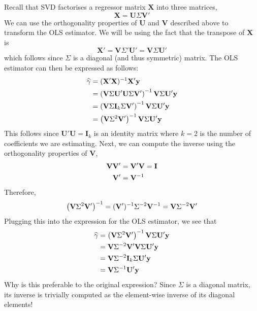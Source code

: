 \documentclass[10pt]{scrartcl}
\begin{document}
Recall that SVD factorises a regressor matrix \(\mathbf{X}\) into three
matrices, \[
\mathbf{X} = \mathbf{U} \Sigma \mathbf{V}'
\] We can use the orthogonality properties of \(\mathbf{U}\) and
\(\mathbf{V}\) described above to transform the OLS estimator. We will
be using the fact that the transpose of \(\mathbf{X}\) is \[
\mathbf{X}' = \mathbf{V} \Sigma' \mathbf{U}' = 
    \mathbf{V} \Sigma \mathbf{U}'
\] which follows since \(\Sigma\) is a diagonal (and thus symmetric)
matrix. The OLS estimator can then be expressed as follows: \[
\def\bV{\mathbf{V}}
\def\bX{\mathbf{X}}
\def\bU{\mathbf{U}}
\def\bY{\mathbf{y}}
\def\ident{\mathbf{I}}
\begin{aligned}
\widehat{\gamma} &= (\mathbf{X}'\mathbf{X})^{-1}\mathbf{X}'\mathbf{y} \\
    &= \left(\bV \Sigma \bU' \bU \Sigma \bV' \right)^{-1}
        \bV \Sigma \bU' \bY \\
    &= \left(\bV \Sigma \ident_k \Sigma \bV' \right)^{-1}
        \bV \Sigma \bU' \bY \\
    &= \left(\bV \Sigma^2 \bV' \right)^{-1}
        \bV \Sigma \bU' \bY \\
\end{aligned}
\] This follows since \(\mathbf{U}'\mathbf{U} = \mathbf{I}_k\) is an
identity matrix where \(k=2\) is the number of coefficients we are
estimating. Next, we can compute the inverse using the orthogonality
properties of \(\mathbf{V}\), \[
\def\bV{\mathbf{V}}
\begin{aligned}
    \bV\bV' &= \bV'\bV = \mathbf{I} \\
    \bV' &= \bV^{-1}
\end{aligned}
\] Therefore, \[
\def\bV{\mathbf{V}}
\begin{aligned}
    \left(\bV \Sigma^2 \bV' \right)^{-1} =
    (\bV')^{-1} \Sigma^{-2} \bV^{-1} = \bV \Sigma^{-2} \bV'
\end{aligned}
\] Plugging this into the expression for the OLS estimator, we see that
\[
\def\bV{\mathbf{V}}
\def\bU{\mathbf{U}}
\def\bY{\mathbf{y}}
\def\ident{\mathbf{I}}
\begin{aligned}
\widehat{\gamma} 
    &= \left(\bV \Sigma^2 \bV' \right)^{-1} \bV \Sigma \bU' \bY \\
    &= \bV \Sigma^{-2} \bV' \bV \Sigma \bU' \bY \\
    &= \bV \Sigma^{-2} \ident_k \Sigma \bU' \bY \\
    &= \bV \Sigma^{-1} \bU' \bY
\end{aligned}
\] Why is this preferable to the original expression? Since \(\Sigma\)
is a diagonal matrix, its inverse is trivially computed as the
element-wise inverse of its diagonal elements!
\end{document}

